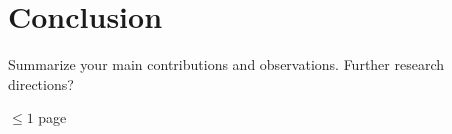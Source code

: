 \chapter{Conclusion}
Summarize your main contributions and observations. Further research directions?

$\leq 1$ page
